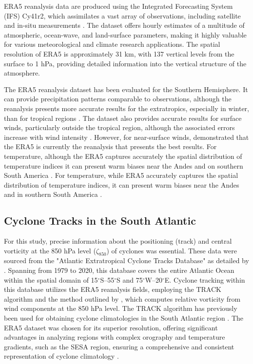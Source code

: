 ERA5 reanalysis data are produced using the Integrated Forecasting System (IFS) Cy41r2, which assimilates a vast array of observations, including satellite and in-situ measurements \citep{hersbach2020era5}. The dataset offers hourly estimates of a multitude of atmospheric, ocean-wave, and land-surface parameters, making it highly valuable for various meteorological and climate research applications. The spatial resolution of ERA5 is approximately 31 km, with 137 vertical levels from the surface to 1 hPa, providing detailed information into the vertical structure of the atmosphere.

The ERA5 reanalysis dataset has been evaluated for the Southern Hemisphere. It can provide precipitation patterns comparable to observations, although the reanalysis presents more accurate results for the extratropics, especially in winter, than for tropical regions \citep{balmaceda2021evaluation,lavers2022evaluation}. The dataset also provides accurate results for surface winds, particularly outside the tropical region, although the associated errors increase with wind intensity \citep{campos2022assessment}. However, for near-surface winds, \citet{ramon2019global} demonstrated that the ERA5 is currently the reanalysis that presents the best results. For temperature, although the ERA5 captures accurately the spatial distribution of temperature indices it can present warm biases near the Andes and on southern South America \citep{balmaceda2021evaluation}. For temperature, while ERA5 accurately captures the spatial distribution of temperature indices, it can present warm biases near the Andes and in southern South America \citep{balmaceda2021evaluation}.


\subsection{Cyclone Tracks in the South Atlantic}
\label{track_method}

For this study, precise information about the positioning (track) and central vorticity at the 850 hPa level (\(\zeta_{850}\)) of cyclones was essential. These data were sourced from the "Atlantic Extratropical Cyclone Tracks Database" as detailed by \citet{gramcianinov2020data}. Spanning from 1979 to 2020, this database covers the entire Atlantic Ocean within the spatial domain of 15\(^\circ\)S–55\(^\circ\)S and 75\(^\circ\)W–20\(^\circ\)E. Cyclone tracking within this database utilizes the ERA5 reanalysis fields, employing the TRACK algorithm \citep{hodges1994general, hodges1995feature} and the method outlined by \citet{hoskins2002new}, which computes relative vorticity from wind components at the 850 hPa level. The TRACK algorithm has previously been used for obtaining cyclone climatologies in the South Atlantic region \citep{gramcianinov2019properties,gramcianinov2020analysis}. The ERA5 dataset was chosen for its superior resolution, offering significant advantages in analyzing regions with complex orography and temperature gradients, such as the SESA region, ensuring a comprehensive and consistent representation of cyclone climatology \citep{gramcianinov2020analysis}.

